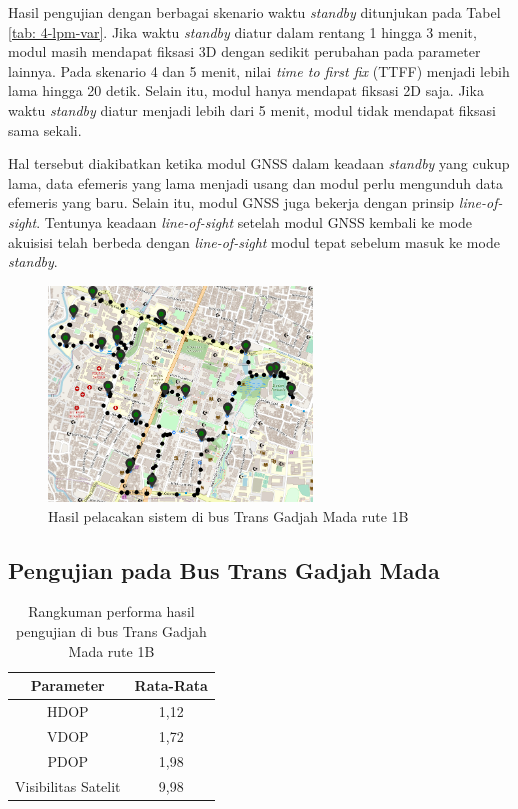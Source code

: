 \documentclass[conference]{IEEEtran}
\begin{document}
Hasil pengujian dengan berbagai skenario waktu \textit{standby} ditunjukan pada Tabel \ref{tab: 4-lpm-var}. Jika waktu \textit{standby} diatur dalam rentang 1 hingga 3 menit, modul masih mendapat fiksasi 3D dengan sedikit perubahan pada parameter lainnya. Pada skenario 4 dan 5 menit, nilai \textit{time to first fix} (TTFF) menjadi lebih lama hingga 20 detik. Selain itu, modul hanya mendapat fiksasi 2D saja. Jika waktu \textit{standby} diatur menjadi lebih dari 5 menit, modul tidak mendapat fiksasi sama sekali.

Hal tersebut diakibatkan ketika modul GNSS dalam keadaan \textit{standby} yang cukup lama, data efemeris yang lama menjadi usang dan modul perlu mengunduh data efemeris yang baru. Selain itu, modul GNSS juga bekerja dengan prinsip \textit{line-of-sight}. Tentunya keadaan \textit{line-of-sight} setelah modul GNSS kembali ke mode akuisisi telah berbeda dengan \textit{line-of-sight} modul tepat sebelum masuk ke mode \textit{standby}.

\begin{figure}[htb!]
	\centering
	\includegraphics[width=7cm]{tracked-route.png}
	\caption{Hasil pelacakan sistem di bus Trans Gadjah Mada rute 1B}
	\label{Fig: 4-tgm-tracked}
\end{figure}

\subsection{Pengujian pada Bus Trans Gadjah Mada}
\begin{table}[H]
	\caption{Rangkuman performa hasil pengujian di bus Trans Gadjah Mada rute 1B}
	\centering
	\renewcommand{\arraystretch}{1.5}
	\begin{tabular}{cc}
		\hline
		\textbf{Parameter} & \textbf{Rata-Rata} \\\hline
		HDOP & 1,12\\
		VDOP & 1,72\\
		PDOP &  1,98\\
		Visibilitas Satelit & 9,98\\
		\hline
	\end{tabular}
	\label{tab: 4-tgm-performance}
\end{table}
\end{document}
